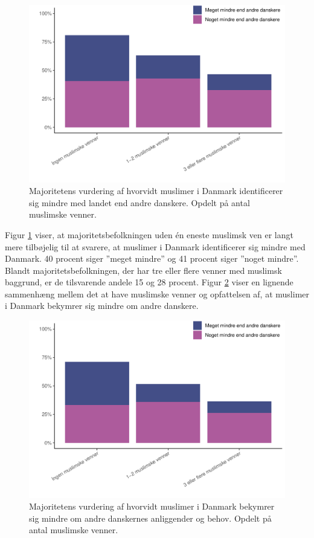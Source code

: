 \documentclass[
]{book}
\begin{document}
\begin{figure}
\includegraphics[width=1\linewidth]{en-befolkning-blander-sig_files/figure-latex/fig-6-4-1} \caption{Majoritetens vurdering af hvorvidt muslimer i Danmark identificerer sig mindre med landet end andre danskere. Opdelt på antal muslimske venner.}\label{fig:fig-6-4}
\end{figure}

Figur \ref{fig:fig-6-4} viser, at majoritetsbefolkningen uden én eneste muslimsk ven er langt mere tilbøjelig til at svarere, at muslimer i Danmark identificerer sig mindre med Danmark. 40 procent siger ''meget mindre'' og 41 procent siger ''noget mindre''. Blandt majoritetsbefolkningen, der har tre eller flere venner med muslimsk baggrund, er de tilsvarende andele 15 og 28 procent. Figur \ref{fig:fig-6-5} viser en lignende sammenhæng mellem det at have muslimske venner og opfattelsen af, at muslimer i Danmark bekymrer sig mindre om andre danskere.

\begin{figure}
\includegraphics[width=1\linewidth]{en-befolkning-blander-sig_files/figure-latex/fig-6-5-1} \caption{Majoritetens vurdering af hvorvidt muslimer i Danmark bekymrer sig mindre om andre danskernes anliggender og behov. Opdelt på antal muslimske venner.}\label{fig:fig-6-5}
\end{figure}
\end{document}
